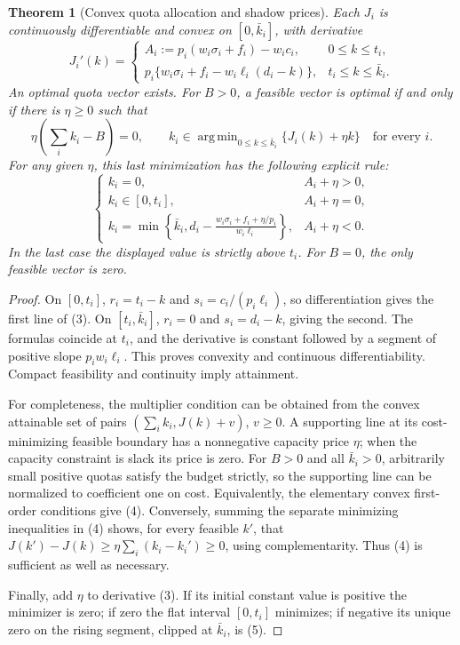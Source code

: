 \documentclass[11pt,a4paper]{article}
\newtheorem{theorem}{Theorem}[section]
\theoremstyle{definition}
\theoremstyle{remark}
\DeclareMathOperator*{\argmin}{arg\,min}
\begin{document}
\begin{theorem}[Convex quota allocation and shadow prices]
Each $J_i$ is continuously differentiable and convex on $[0,\bar k_i]$, with derivative
\[
 J_i'(k)=
 \begin{cases}
 A_i:=p_i(w_i\sigma_i+f_i)-w_ic_i,&0\le k\le t_i,\\
 p_i\{w_i\sigma_i+f_i-w_i\ell_i(d_i-k)\},&t_i\le k\le\bar k_i.
 \end{cases} \tag{3}
\]
An optimal quota vector exists. For $B>0$, a feasible vector is optimal if and only if there is $\eta\ge0$ such that
\[
 \eta\left(\sum_i k_i-B\right)=0,
 \qquad
 k_i\in\argmin_{0\le k\le\bar k_i}\{J_i(k)+\eta k\}\quad\text{for every }i. \tag{4}
\]
For any given $\eta$, this last minimization has the following explicit rule:
\[
 \begin{cases}
 k_i=0,&A_i+\eta>0,\\
 k_i\in[0,t_i],&A_i+\eta=0,\\
 k_i=\displaystyle\min\left\{\bar k_i,
 d_i-\frac{w_i\sigma_i+f_i+\eta/p_i}{w_i\ell_i}\right\},&A_i+\eta<0.
 \end{cases} \tag{5}
\]
In the last case the displayed value is strictly above $t_i$. For $B=0$, the only feasible vector is zero.
\end{theorem}
\begin{proof}
On $[0,t_i]$, $r_i=t_i-k$ and $s_i=c_i/(p_i\ell_i)$, so differentiation gives the first line of (3). On $[t_i,\bar k_i]$, $r_i=0$ and $s_i=d_i-k$, giving the second. The formulas coincide at $t_i$, and the derivative is constant followed by a segment of positive slope $p_iw_i\ell_i$. This proves convexity and continuous differentiability. Compact feasibility and continuity imply attainment.

For completeness, the multiplier condition can be obtained from the convex attainable set of pairs $(\sum_i k_i,J(k)+v)$, $v\ge0$. A supporting line at its cost-minimizing feasible boundary has a nonnegative capacity price $\eta$; when the capacity constraint is slack its price is zero. For $B>0$ and all $\bar k_i>0$, arbitrarily small positive quotas satisfy the budget strictly, so the supporting line can be normalized to coefficient one on cost. Equivalently, the elementary convex first-order conditions give (4). Conversely, summing the separate minimizing inequalities in (4) shows, for every feasible $k'$, that
$J(k')-J(k)\ge\eta\sum_i(k_i-k_i')\ge0$, using complementarity. Thus (4) is sufficient as well as necessary.

Finally, add $\eta$ to derivative (3). If its initial constant value is positive the minimizer is zero; if zero the flat interval $[0,t_i]$ minimizes; if negative its unique zero on the rising segment, clipped at $\bar k_i$, is (5).
\end{proof}
\end{document}
